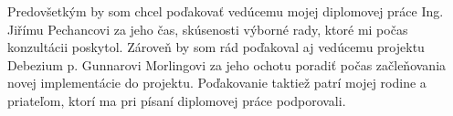 
	\acknowledgements
	\noindent
Predovšetkým by som chcel poďakovať vedúcemu mojej diplomovej práce Ing. Jiřímu Pechancovi za jeho čas, skúsenosti výborné rady, ktoré mi počas konzultácii poskytol. Zároveň by som rád poďakoval aj vedúcemu projektu Debezium p. Gunnarovi Morlingovi za jeho ochotu poradiť počas začleňovania novej implementácie do projektu. Poďakovanie taktiež patrí mojej rodine a priateľom, ktorí ma pri písaní diplomovej práce podporovali.
